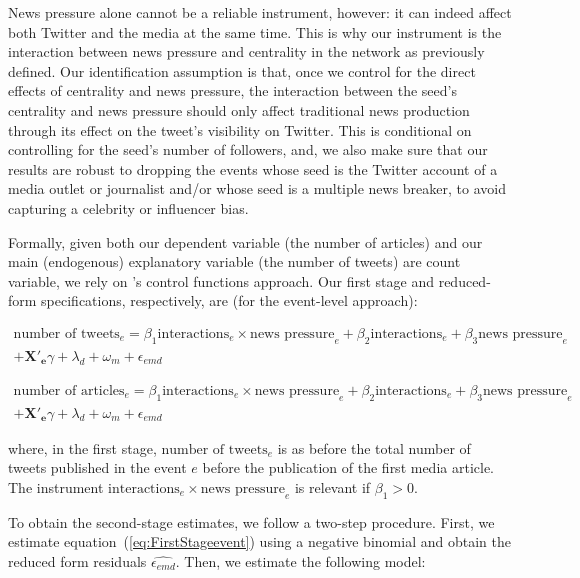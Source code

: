News pressure alone cannot be a reliable instrument, however: it can indeed affect both Twitter and the media at the same time. This is why our instrument is the interaction between news pressure and centrality in the network as previously defined. Our identification assumption is that, once we control for the direct effects of centrality and news pressure, the interaction between the seed's centrality and news pressure should only affect traditional news production through its effect on the tweet's visibility on Twitter. This is conditional on controlling for the seed's number of followers, and, we also make sure that our results are robust to dropping the events whose seed is the Twitter account of a media outlet or journalist and/or whose seed is a multiple news breaker, to avoid capturing a celebrity or influencer bias.

Formally, given both our dependent variable (the number of articles) and our main (endogenous) explanatory variable (the number of tweets) are count variable, we rely on \citet{Woodbrige2002,Wooldridge2013}'s control functions approach. Our first stage and reduced-form specifications, respectively, are (for the event-level approach):
 
\begin{multline}
\text{number of tweets}_{e}= \beta_{1} \text{interactions}_{e} \times \text{news pressure}_{e}  + \beta_{2} \text{interactions}_{e} + \beta_{3} \text{news pressure}_{e} \\ 
+ \mathbf{X'_{e}}\gamma + \lambda_d + \omega_m + \epsilon_{emd}
\label{eq:FirstStageevent}
\end{multline} 

\begin{multline}
\text{number of articles}_{e}= \beta_{1} \text{interactions}_{e} \times \text{news pressure}_{e}  + \beta_{2} \text{interactions}_{e} + \beta_{3} \text{news pressure}_{e} \\ 
+ \mathbf{X'_{e}}\gamma + \lambda_d + \omega_m + \epsilon_{emd}
\label{eq:RFevent}
\end{multline} 

\noindent where, in the first stage, $\text{number of tweets}_{e}$ is as before the total number of tweets published in the event $e$ before the publication of the first media article. The instrument $\text{interactions}_{e} \times \text{news pressure}_{e}$ is relevant if $\beta_{1}>0$.

To obtain the second-stage estimates, we follow a two-step procedure. First, we estimate equation~(\ref{eq:FirstStageevent}) using a negative binomial and obtain the reduced form residuals $\widehat{\epsilon_{emd}}$. Then, we estimate the following model:

